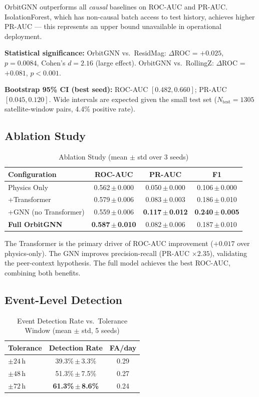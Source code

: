 \documentclass[conference]{IEEEtran}
\begin{document}
OrbitGNN outperforms all \emph{causal} baselines on ROC-AUC and
PR-AUC. IsolationForest, which has non-causal batch access to test
history, achieves higher PR-AUC — this represents an upper bound
unavailable in operational deployment.

\textbf{Statistical significance:}
OrbitGNN vs.\ ResidMag: $\Delta$ROC = $+0.025$,
$p = 0.0084$, Cohen's $d = 2.16$ (large effect).
OrbitGNN vs.\ RollingZ: $\Delta$ROC = $+0.081$, $p < 0.001$.

\textbf{Bootstrap 95\% CI (best seed):}
ROC-AUC $[0.482, 0.660]$; PR-AUC $[0.045, 0.120]$.
Wide intervals are expected given the small test set
($N_\text{test}=1305$ satellite-window pairs, 4.4\% positive rate).

\subsection{Ablation Study}

\begin{table}[h]
\centering
\caption{Ablation Study (mean $\pm$ std over 3 seeds)}
\label{tab:ablation}
\begin{tabular}{@{}lccc@{}}
\toprule
Configuration & ROC-AUC & PR-AUC & F1 \\
\midrule
Physics Only         & 0.562\,$\pm$\,0.000 & 0.050\,$\pm$\,0.000 & 0.106\,$\pm$\,0.000 \\
+Transformer         & 0.579\,$\pm$\,0.006 & 0.083\,$\pm$\,0.003 & 0.186\,$\pm$\,0.010 \\
+GNN (no Transformer) & 0.559\,$\pm$\,0.006 & \textbf{0.117\,$\pm$\,0.012} & \textbf{0.240\,$\pm$\,0.005} \\
\textbf{Full OrbitGNN} & \textbf{0.587\,$\pm$\,0.010} & 0.082\,$\pm$\,0.006 & 0.187\,$\pm$\,0.010 \\
\bottomrule
\end{tabular}
\end{table}

The Transformer is the primary driver of ROC-AUC improvement ($+0.017$
over physics-only). The GNN improves precision-recall (PR-AUC
$\times 2.35$), validating the peer-context hypothesis. The full model
achieves the best ROC-AUC, combining both benefits.

\subsection{Event-Level Detection}

\begin{table}[h]
\centering
\caption{Event Detection Rate vs.\ Tolerance Window (mean $\pm$ std, 5 seeds)}
\label{tab:edr}
\begin{tabular}{@{}lcc@{}}
\toprule
Tolerance & Detection Rate & FA/day \\
\midrule
$\pm24$\,h & 39.3\%\,$\pm$\,3.3\% & 0.29 \\
$\pm48$\,h & 51.3\%\,$\pm$\,7.5\% & 0.27 \\
$\pm72$\,h & \textbf{61.3\%\,$\pm$\,8.6\%} & 0.24 \\
\bottomrule
\end{tabular}
\end{table}
\end{document}
